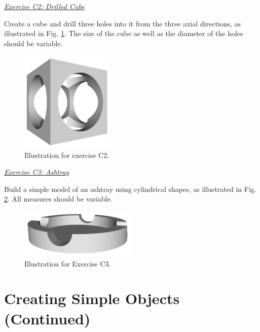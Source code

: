 \documentclass[article,A4,12pt]{llncs}
\begin{document}
\noindent
\underline{\em Exercise C2: Drilled Cube}

Create a cube and drill three holes into it from the three axial 
directions, as illustrated in Fig. \ref{fig:drilledcube}.
The size of the cube as well as the diameter of the holes should 
be variable. 

\newpage

\begin{figure}[!ht]
\begin{center}
\includegraphics[width=0.4\textwidth]{img/drilledcube.png}
\end{center}
\vspace{-2mm}
\caption{Illustration for exercise C2.}
\label{fig:drilledcube}
\end{figure}
\noindent
\noindent
\underline{\em Exercise C3: Ashtray}

Build a simple model of an ashtray using cylindrical shapes, 
as illustrated in Fig. \ref{fig:ashtray}.
All measures should be variable.


\begin{figure}[!ht]
\begin{center}
\includegraphics[width=0.5\textwidth]{img/ashtray.png}
\end{center}
\vspace{-2mm}
\caption{Illustration for Exercise C3.}
\label{fig:ashtray}
\end{figure}
\noindent


\section{Creating Simple Objects (Continued)} \label{sec:cso2}
\end{document}
